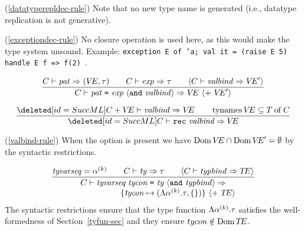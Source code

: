 \begin{description}
\item{(\ref{datatyperepldec-rule})}
Note that no new type name is generated (i.e., datatype replication is
not generative).

\item{\CUT{(\ref{abstypedec-rule})}}

\item{(\ref{exceptiondec-rule})}
No closure operation is used here, as this would make the type system unsound.
Example: {\tt exception E of 'a; val it = (raise E 5) handle E f => f(2)}~.
\end{description}%

%
\begin{equation}        %
\label{valbind-rule}
\frac{\C\ts\pat\ra(\VE,\tau)\qquad\C\ts\exp\ra\tau\qquad
      \langle\C\ts\valbind\ra\VE'\rangle }
     {\C\ts\longvalbind\ra\VE\ \langle +\ \VE'\rangle}\index{29.1}
\end{equation}

\begin{equation}        %
\label{recvalbind-rule}
\frac{\CUT{\C+\VE\ts\valbind\ra\VE\qquad\TyNamesFcn\VE\subseteq\of{\T}{\C}}}
     {\CUT{\C\ts\recvalbind\ra\VE}}
\end{equation}
\comments
\begin{description}
\item{(\ref{valbind-rule})}
When the option is present we have $\mathop{\rm Dom}\nolimits\mbox{$V\!E$}\cap
\mathop{\rm Dom}\nolimits\mbox{$V\!E$}' = \emptyset$ by the syntactic restrictions.
\oldpagebreak
\item{\CUT{(\ref{recvalbind-rule})}}
\end{description}

\begin{equation}        %
\frac{\tyvarseq=\alphak\qquad\C\ts\ty\ra\tau\qquad
      \langle\C\ts\typbind\ra\TE\rangle}
     {\begin{array}{c}
      \C\ts\longtypbind\ra\\
      \qquad\qquad\qquad
      \{\tycon\mapsto(\typefcnk,\emptymap)\}\ \langle +\ \TE\rangle
      \end{array}
     }\index{29.3}
\end{equation}
\comment The syntactic restrictions ensure that the type function
$\Lambda\mbox{$\alpha^{(k)}$}.\tau$ satisfies the well-formedness of
Section~\ref{tyfun-sec} and they ensure $tycon\notin\mathop{\rm Dom}\nolimits\mbox{$T\!E$}$.

